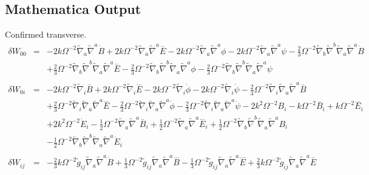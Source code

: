 \documentclass[10pt,letterpaper]{article}
\numberwithin{equation}{section}
\begin{document}
\begin{appendices}
	\section{Mathematica Output}
Confirmed transverse. 
\begin{eqnarray}
\delta W_{00}&=& -2 k \Omega^{-2} \tilde{\nabla}_{a}\tilde{\nabla}^{a}\dot{B} + 2 k \Omega^{-2} \tilde{\nabla}_{a}\tilde{\nabla}^{a}\overset{..}{E} - 2 k \Omega^{-2} \tilde{\nabla}_{a}\tilde{\nabla}^{a}\phi - 2 k \Omega^{-2} \tilde{\nabla}_{a}\tilde{\nabla}^{a}\psi -  \tfrac{2}{3} \Omega^{-2} \tilde{\nabla}_{b}\tilde{\nabla}^{b}\tilde{\nabla}_{a}\tilde{\nabla}^{a}\dot{B} \nonumber \\ 
&& + \tfrac{2}{3} \Omega^{-2} \tilde{\nabla}_{b}\tilde{\nabla}^{b}\tilde{\nabla}_{a}\tilde{\nabla}^{a}\overset{..}{E} -  \tfrac{2}{3} \Omega^{-2} \tilde{\nabla}_{b}\tilde{\nabla}^{b}\tilde{\nabla}_{a}\tilde{\nabla}^{a}\phi -  \tfrac{2}{3} \Omega^{-2} \tilde{\nabla}_{b}\tilde{\nabla}^{b}\tilde{\nabla}_{a}\tilde{\nabla}^{a}\psi 
\\  \nonumber\\ 
\delta W_{0i}&=& -2 k \Omega^{-2} \tilde{\nabla}_{i}\overset{..}{B} + 2 k \Omega^{-2} \tilde{\nabla}_{i}\overset{...}{E} - 2 k \Omega^{-2} \tilde{\nabla}_{i}\dot{\phi} - 2 k \Omega^{-2} \tilde{\nabla}_{i}\dot{\psi} -  \tfrac{2}{3} \Omega^{-2} \tilde{\nabla}_{i}\tilde{\nabla}_{a}\tilde{\nabla}^{a}\overset{..}{B} \nonumber \\ 
&& + \tfrac{2}{3} \Omega^{-2} \tilde{\nabla}_{i}\tilde{\nabla}_{a}\tilde{\nabla}^{a}\overset{...}{E} -  \tfrac{2}{3} \Omega^{-2} \tilde{\nabla}_{i}\tilde{\nabla}_{a}\tilde{\nabla}^{a}\dot{\phi} -  \tfrac{2}{3} \Omega^{-2} \tilde{\nabla}_{i}\tilde{\nabla}_{a}\tilde{\nabla}^{a}\dot{\psi}-2 k^2 \Omega^{-2} B_{i} -  k \Omega^{-2} \overset{..}{B}_{i} + k \Omega^{-2} \overset{...}{E}_{i} \nonumber \\ 
&& + 2 k^2 \Omega^{-2} \dot{E}_{i} -  \tfrac{1}{2} \Omega^{-2} \tilde{\nabla}_{a}\tilde{\nabla}^{a}\overset{..}{B}_{i} + \tfrac{1}{2} \Omega^{-2} \tilde{\nabla}_{a}\tilde{\nabla}^{a}\overset{...}{E}_{i} + \tfrac{1}{2} \Omega^{-2} \tilde{\nabla}_{b}\tilde{\nabla}^{b}\tilde{\nabla}_{a}\tilde{\nabla}^{a}B_{i} \nonumber \\ 
&& -  \tfrac{1}{2} \Omega^{-2} \tilde{\nabla}_{b}\tilde{\nabla}^{b}\tilde{\nabla}_{a}\tilde{\nabla}^{a}\dot{E}_{i}
\\  \nonumber\\ 
\delta W_{ij}&=& - \tfrac{2}{3} k \Omega^{-2} \tilde{g}_{ij} \tilde{\nabla}_{a}\tilde{\nabla}^{a}\dot{B} + \tfrac{1}{3} \Omega^{-2} \tilde{g}_{ij} \tilde{\nabla}_{a}\tilde{\nabla}^{a}\overset{...}{B} -  \tfrac{1}{3} \Omega^{-2} \tilde{g}_{ij} \tilde{\nabla}_{a}\tilde{\nabla}^{a}\overset{....}{E} + \tfrac{2}{3} k \Omega^{-2} \tilde{g}_{ij} \tilde{\nabla}_{a}\tilde{\nabla}^{a}\overset{..}{E} \nonumber \\ 

\end{eqnarray}
\end{appendices}
\end{document}
